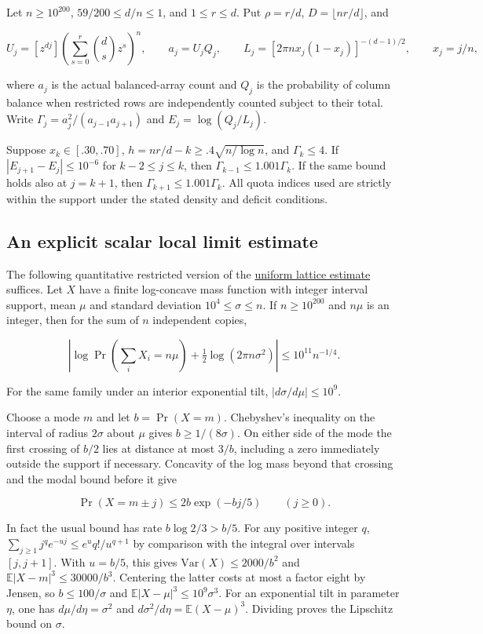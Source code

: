 \documentclass[11pt]{article}
\begin{document}
Let $n\ge10^{200}$, $59/200\le d/n\le1$, and $1\le r\le d$.
Put $\rho=r/d$, $D=\lfloor nr/d\rfloor$, and

\[
U_j=[z^{dj}]\left(\sum_{s=0}^r\binom ds z^s\right)^n,
\qquad a_j=U_jQ_j,\qquad
L_j=[2\pi n x_j(1-x_j)]^{-(d-1)/2},
\qquad x_j=j/n,
\]

where $a_j$ is the actual balanced-array count and $Q_j$ is the probability of
column balance when restricted rows are independently counted subject to
their total. Write $\Gamma_j=a_j^2/(a_{j-1}a_{j+1})$ and $E_j=\log(Q_j/L_j)$.

Suppose $x_k\in[.30,.70]$, $h=nr/d-k\ge .4\sqrt{n/\log n}$, and
$\Gamma_k\le4$. If $|E_{j+1}-E_j|\le10^{-6}$ for $k-2\le j\le k$,
then $\Gamma_{k-1}\le1.001\Gamma_k$. If the same bound holds also at
$j=k+1$, then $\Gamma_{k+1}\le1.001\Gamma_k$. All quota indices used are
strictly within the support under the stated density and deficit conditions.


\subsection{An explicit scalar local limit estimate}

The following quantitative restricted version of the
\href{https://github.com/ProgramComputer/open-math-research/blob/main/topics/balanced-arrays/dense-regime/uniform-lattice-lemma.md}{uniform lattice estimate} suffices.
Let $X$ have a finite log-concave mass function with integer interval
support, mean $\mu$ and standard deviation $10^4\le\sigma\le n$.
If $n\ge10^{200}$ and $n\mu$ is an integer, then for the sum of $n$
independent copies,

\[
\left|\log\Pr\left(\sum_iX_i=n\mu\right)
+\tfrac12\log(2\pi n\sigma^2)\right|\le 10^{11}n^{-1/4}.
\]

For the same family under an interior exponential tilt,
$|d\sigma/d\mu|\le 10^9$.

Choose a mode $m$ and let $b=\Pr(X=m)$. Chebyshev's inequality on the interval
of radius $2\sigma$ about $\mu$ gives $b\ge1/(8\sigma)$. On either side of
the mode the first crossing of $b/2$ lies at distance at most $3/b$,
including a zero immediately outside the support if necessary. Concavity of
the log mass beyond that crossing and the modal bound before it give

\[
\Pr(X=m\pm j)\le2b\exp(-bj/5)\qquad(j\ge0).
\]

In fact the usual bound has rate $b\log 2/3>b/5$. For any positive integer
$q$, $\sum_{j\ge1}j^q e^{-u j}\le e^u q!/u^{q+1}$ by comparison with the
integral over intervals $[j,j+1]$. With $u=b/5$, this gives
$\mathrm{Var}(X)\le2000/b^2$ and
$\mathbb E|X-m|^3\le30000/b^3$. Centering the latter costs at most a factor
eight by Jensen, so $b\le100/\sigma$ and
$\mathbb E|X-\mu|^3\le10^9\sigma^3$.
For an exponential tilt in parameter $\eta$, one has
$d\mu/d\eta=\sigma^2$ and $d\sigma^2/d\eta=\mathbb E(X-\mu)^3$.
Dividing proves the Lipschitz bound on $\sigma$.
\end{document}
